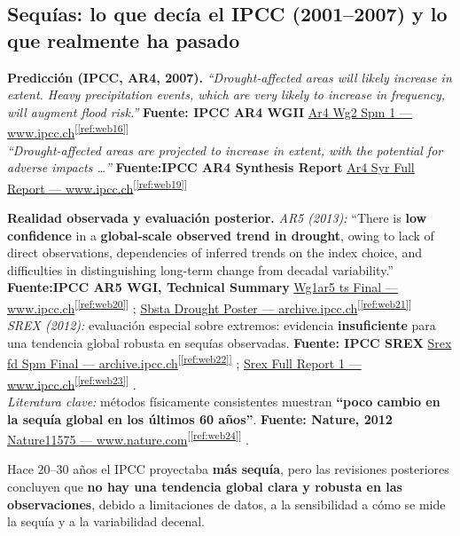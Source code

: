 \documentclass[
  10pt,
  a4paper,
  DIV=11,
  numbers=noendperiod,
  open=any]{scrreprt}
\numberwithin{equation}{chapter}
\numberwithin{equation}{section}
\renewcommand{\[}{\begin{equation}}
\renewcommand{\]}{\end{equation}}
\newcommand{\refweb}[3]{%
  \href{#1}{#2}\textsuperscript{[\ref{ref:#3}]}%
}
\begin{document}
\subsection{Sequías: lo que decía el IPCC (2001--2007) y lo que realmente ha pasado}

\textbf{Predicción (IPCC, AR4, 2007).}
\emph{“Drought-affected areas will likely increase in extent. Heavy precipitation events, which are very likely to increase in frequency, will augment flood risk.”}
\textbf{Fuente: IPCC AR4 WGII} \refweb{https://www.ipcc.ch/site/assets/uploads/2018/02/ar4-wg2-spm-1.pdf}{Ar4 Wg2 Spm 1 — www.ipcc.ch}{web16}\\
\emph{“Drought-affected areas are projected to increase in extent, with the potential for adverse impacts \dots{}”}
\textbf{Fuente:IPCC AR4 Synthesis Report } \refweb{https://www.ipcc.ch/site/assets/uploads/2018/02/ar4_syr_full_report.pdf}{Ar4 Syr Full Report — www.ipcc.ch}{web19}

\medskip

\textbf{Realidad observada y evaluación posterior.}
\emph{AR5 (2013):} “There is \textbf{low confidence} in a \textbf{global-scale observed trend in drought}, owing to lack of direct observations, dependencies of inferred trends on the index choice, and difficulties in distinguishing long-term change from decadal variability.”
\textbf{Fuente:IPCC AR5 WGI, Technical Summary} \refweb{https://www.ipcc.ch/site/assets/uploads/2018/02/WG1AR5_TS_FINAL.pdf}{Wg1ar5 ts Final — www.ipcc.ch}{web20}; \refweb{https://archive.ipcc.ch/news_and_events/docs/SBSTA-44/Sbsta_drought_poster.pdf}{Sbsta Drought Poster — archive.ipcc.ch}{web21}\\
\emph{SREX (2012):} evaluación especial sobre extremos: evidencia \textbf{insuficiente} para una tendencia global robusta en sequías observadas.
\textbf{Fuente: IPCC SREX} \refweb{https://archive.ipcc.ch/pdf/special-reports/srex/SREX_FD_SPM_final.pdf}{Srex fd Spm Final — archive.ipcc.ch}{web22}; \refweb{https://www.ipcc.ch/site/assets/uploads/2018/03/SREX_Full_Report-1.pdf}{Srex Full Report 1 — www.ipcc.ch}{web23}.\\
\emph{Literatura clave:} métodos físicamente consistentes muestran \textbf{“poco cambio en la sequía global en los últimos 60 años”}.
\textbf{Fuente: Nature, 2012} \refweb{https://www.nature.com/articles/nature11575}{Nature11575 — www.nature.com}{web24}.\\

\medskip

Hace 20--30 años el IPCC proyectaba \textbf{más sequía}, pero las revisiones posteriores concluyen que \textbf{no hay una tendencia global clara y robusta en las observaciones}, debido a limitaciones de datos, a la sensibilidad a cómo se mide la sequía y a la variabilidad decenal. 
\end{document}
